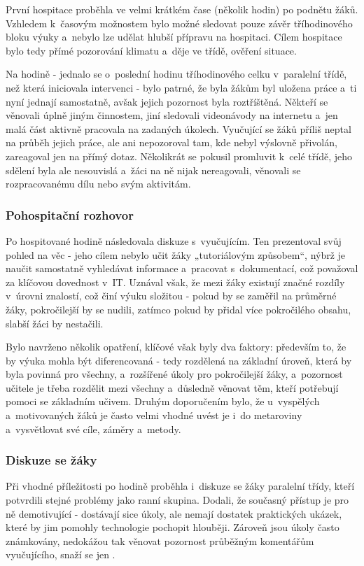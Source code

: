 První hospitace proběhla ve velmi krátkém čase (několik hodin) po podnětu žáků. Vzhledem k~časovým možnostem bylo možné sledovat pouze závěr tříhodinového bloku výuky a~nebylo lze udělat hlubší přípravu na hospitaci. Cílem hospitace bylo tedy přímé pozorování klimatu a~děje ve třídě, ověření situace.

Na hodině - jednalo se o~poslední hodinu tříhodinového celku v~paralelní třídě, než která iniciovala intervenci - bylo patrné, že byla žákům byl uložena práce a~ti nyní jednají samostatně, avšak jejich pozornost byla roztříštěná. Někteří se věnovali úplně jiným činnostem, jiní sledovali videonávody na internetu a~jen malá část aktivně pracovala na zadaných úkolech. Vyučující se žáků příliš neptal na průběh jejich práce, ale ani nepozoroval tam, kde nebyl výslovně přivolán, zareagoval jen na přímý dotaz. Několikrát se pokusil promluvit k~celé třídě, jeho sdělení byla ale nesouvislá a~žáci na ně nijak nereagovali, věnovali se rozpracovanému dílu nebo svým aktivitám. 

\subsubsection*{Pohospitační rozhovor}

Po hospitované hodině následovala diskuze s~vyučujícím. Ten prezentoval svůj pohled na věc - jeho cílem nebylo učit žáky „tutoriálovým způsobem“, nýbrž je naučit samostatně vyhledávat informace a~pracovat s~dokumentací, což považoval za klíčovou dovednost v~IT. Uznával však, že mezi žáky existují značné rozdíly v~úrovni znalostí, což činí výuku složitou - pokud by se zaměřil na průměrné žáky, pokročilejší by se nudili, zatímco pokud by přidal více pokročilého obsahu, slabší žáci by nestačili.

Bylo navrženo několik opatření, klíčové však byly dva faktory: především to, že by výuka mohla být diferencovaná - tedy rozdělená na základní úroveň, která by byla povinná pro všechny, a~rozšířené úkoly pro pokročilejší žáky, a~pozornost učitele je třeba rozdělit mezi všechny a~důsledně věnovat těm, kteří potřebují pomoci se základním učivem. Druhým doporučením bylo, že u~vyspělých a~motivovaných žáků je často velmi vhodné uvést je i~do metaroviny a~vysvětlovat své cíle, záměry a~metody.

\subsubsection*{Diskuze se žáky}
Při vhodné příležitosti po hodině proběhla i~diskuze se žáky paralelní třídy, kteří potvrdili stejné problémy jako ranní skupina. Dodali, že současný přístup je pro ně demotivující - dostávají sice úkoly, ale nemají dostatek praktických ukázek, které by jim pomohly technologie pochopit hlouběji. Zároveň jsou úkoly často známkovány, nedokážou tak věnovat pozornost průběžným komentářům vyučujícího, snaží se jen .


